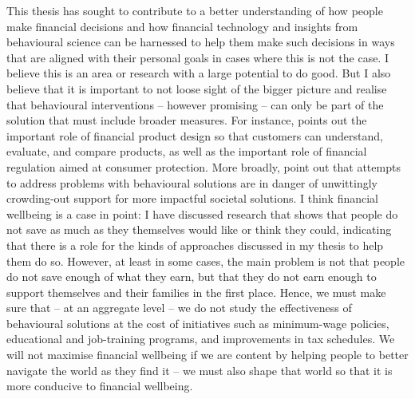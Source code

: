 This thesis has sought to contribute to a better understanding of how people make financial decisions and how financial technology and insights from behavioural science can be harnessed to help them make such decisions in ways that are aligned with their personal goals in cases where this is not the case. I believe this is an area or research with a large potential to do good. But I also believe that it is
important to not loose sight of the bigger picture and realise that
behavioural interventions -- however promising -- can only be part of the
solution that must include broader measures. For instance,
\citet{agarwal2017shapes} points out the important role of financial product
design so that customers can understand, evaluate, and compare products, as
well as the important role of financial regulation aimed at consumer
protection. More broadly, \citet{chater2022frame} point out that attempts to
address problems with behavioural solutions are in danger of unwittingly
crowding-out support for more impactful societal solutions. I think financial
wellbeing is a case in point: I have discussed research that shows that people
do not save as much as they themselves would like or think they could, indicating that there is a role for
the kinds of approaches discussed in my thesis to help them do so. However, at
least in some cases, the main problem is not that people do not save
enough of what they earn, but that they do not earn enough to support
themselves and their families in the first place. Hence, we must make sure that
-- at an aggregate level -- we do not study the effectiveness of behavioural
solutions at the cost of initiatives such as minimum-wage policies, educational
and job-training programs, and improvements in tax schedules. We will not
maximise financial wellbeing if we are content by helping people to better
navigate the world as they find it -- we must also shape that world so that it
is more conducive to financial wellbeing.
